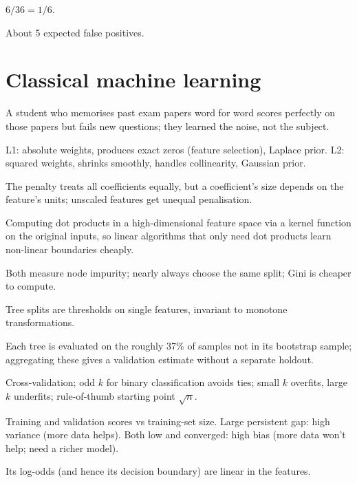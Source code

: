 \A $6/36=1/6$.

\A About 5 expected false positives.

\section{Classical machine learning}
\A A student who memorises past exam papers word for word scores perfectly on those papers but fails new questions; they learned the noise, not the subject.

\A L1: absolute weights, produces exact zeros (feature selection), Laplace prior. L2: squared weights, shrinks smoothly, handles collinearity, Gaussian prior.

\A The penalty treats all coefficients equally, but a coefficient's size depends on the feature's units; unscaled features get unequal penalisation.

\A Computing dot products in a high-dimensional feature space via a kernel function on the original inputs, so linear algorithms that only need dot products learn non-linear boundaries cheaply.

\A Both measure node impurity; nearly always choose the same split; Gini is cheaper to compute.

\A Tree splits are thresholds on single features, invariant to monotone transformations.

\A Each tree is evaluated on the roughly 37\% of samples not in its bootstrap sample; aggregating these gives a validation estimate without a separate holdout.

\A Cross-validation; odd $k$ for binary classification avoids ties; small $k$ overfits, large $k$ underfits; rule-of-thumb starting point $\sqrt n$.

\A Training and validation scores vs training-set size. Large persistent gap: high variance (more data helps). Both low and converged: high bias (more data won't help; need a richer model).

\A Its log-odds (and hence its decision boundary) are linear in the features.

